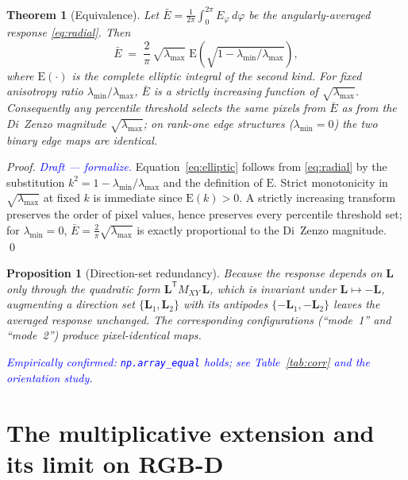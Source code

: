 \documentclass[11pt,a4paper]{article}
\newcommand{\note}[1]{\textcolor{blue}{\textit{#1}}}
\theoremstyle{plain}
\newtheorem{theorem}{Theorem}
\newtheorem{proposition}{Proposition}
\theoremstyle{definition}
\newcommand{\Lvec}{\mathbf{L}}
\newcommand{\lmax}{\lambda_{\max}}
\newcommand{\lmin}{\lambda_{\min}}
\newcommand{\Mxy}{M_{XY}}
\newcommand{\transpose}{^{\mathsf T}}
\begin{document}
\begin{theorem}[Equivalence]
\label{thm:equiv}
Let $\bar E = \frac{1}{2\pi}\int_0^{2\pi} E_\varphi\,d\varphi$ be the
angularly-averaged response \eqref{eq:radial}. Then
\begin{equation}
\label{eq:elliptic}
\bar E \;=\; \frac{2}{\pi}\,\sqrt{\lmax}\;
\mathrm{E}\!\left(\sqrt{1-\lmin/\lmax}\right),
\end{equation}
where $\mathrm{E}(\cdot)$ is the complete elliptic integral of the second
kind. For fixed anisotropy ratio $\lmin/\lmax$, $\bar E$ is a strictly
increasing function of $\sqrt{\lmax}$. Consequently any percentile threshold
selects the same pixels from $\bar E$ as from the Di~Zenzo magnitude
$\sqrt{\lmax}$; on rank-one edge structures ($\lmin=0$) the two binary edge
maps are identical.
\end{theorem}

\begin{proof}
\note{Draft --- formalize.}
Equation~\eqref{eq:elliptic} follows from \eqref{eq:radial} by the
substitution $k^2 = 1-\lmin/\lmax$ and the definition of $\mathrm{E}$.
Strict monotonicity in $\sqrt{\lmax}$ at fixed $k$ is immediate since
$\mathrm{E}(k)>0$. A strictly increasing transform preserves the order of
pixel values, hence preserves every percentile threshold set; for
$\lmin=0$, $\bar E=\frac{2}{\pi}\sqrt{\lmax}$ is exactly proportional to the
Di~Zenzo magnitude. \qed
\end{proof}

\begin{proposition}[Direction-set redundancy]
\label{prop:mode}
Because the response depends on $\Lvec$ only through the quadratic form
$\Lvec\transpose \Mxy\,\Lvec$, which is invariant under $\Lvec\mapsto-\Lvec$,
augmenting a direction set $\{\Lvec_1,\Lvec_2\}$ with its antipodes
$\{-\Lvec_1,-\Lvec_2\}$ leaves the averaged response unchanged. The
corresponding configurations (``mode~1'' and ``mode~2'') produce
pixel-identical maps.
\end{proposition}

\note{Empirically confirmed: \texttt{np.array\_equal} holds; see
Table~\ref{tab:corr} and the orientation study.}

\section{The multiplicative extension and its limit on RGB-D}
\label{sec:rgbd}
\end{document}
